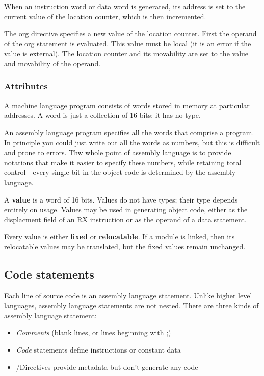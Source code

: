 \documentclass[11pt]{article}
\begin{document}
When an instruction word or data word is generated, its address is set
to the current value of the location counter, which is then
incremented.

The org directive specifies a new value of the location counter.
First the operand of the org statement is evaluated.  This value must
be local (it is an error if the value is external).  The location
counter and its movability are set to the value and movability of the
operand.

\subsubsection*{Attributes}
\label{sec:org22dfc56}

A machine language program consists of words stored in memory at
particular addresses.  A word is just a collection of 16 bits; it has
no type.

An assembly language program specifies all the words that comprise a
program.  In principle you could just write out all the words as
numbers, but this is difficult and prone to errors.  Thw whole point
of assembly language is to provide notations that make it easier to
specify these numbers, while retaining total control---every single
bit in the object code is determined by the assembly language.

A \textbf{value} is a word of 16 bits.  Values do not have types; their type
depends entirely on usage.  Values may be used in generating object
code, either as the displacment field of an RX instruction or as the
operand of a data statement.

Every value is either \textbf{fixed} or \textbf{relocatable}.  If a module is
linked, then its relocatable values may be translated, but the fixed
values remain unchanged.

\subsection*{Code statements}
\label{sec:org92a75da}
Each line of source code is an assembly language statement.  Unlike
higher level languages, assembly language statements are not nested.
There are three kinds of assembly language statement:

\begin{itemize}
\item \emph{Comments} (blank lines, or lines beginning with ;)
\item \emph{Code} statements define instructions or constant data
\item /Directives provide metadata but don't generate any code
\end{itemize}
\end{document}
